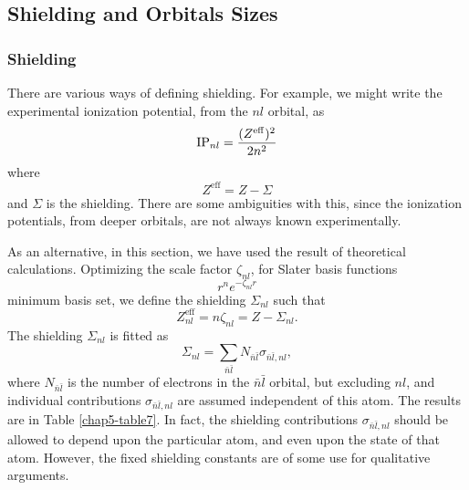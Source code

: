 \subsection{Shielding and Orbitals Sizes}

\subsubsection{Shielding}

There are various ways of defining shielding. For example, we might write the
experimental ionization potential, from the $nl$ orbital, as
\begin{equation}
\mathrm{IP}_{nl} = {(Z^\mathrm{eff})^2 \over 2n^2}
\end{equation}
where
\begin{equation}
Z^\mathrm{eff} = Z - \Sigma
\end{equation}
and $\Sigma$ is the shielding.  There are some ambiguities with this, since 
the ionization potentials, from deeper orbitals, are not always known 
experimentally.

As an alternative, in this section, we have used the result of 
theoretical calculations.  Optimizing the scale factor $\zeta_{nl}$, 
for Slater basis functions
\begin{equation}
r^n e^{- \zeta_{nl}r}
\end{equation}
minimum basis set, we define the shielding $\Sigma_{nl}$ such that
\begin{equation}
Z^\mathrm{eff}_{nl} = n \zeta_{nl} = Z - \Sigma_{nl} .
\end{equation}
The shielding $\Sigma_{nl}$ is fitted as
\begin{equation}
\Sigma_{nl} = \sum_{{\bar n}{\bar l}} N_{{\bar n}{\bar l}} 
\sigma_{{\bar n}{\bar l},nl},
\end{equation}
where $N_{{\bar n}{\bar l}}$ is the number of electrons in the ${{\bar
n}{\bar l}}$ orbital, but excluding $nl$, and individual contributions
$\sigma_{{\bar n}{\bar l},nl}$ are assumed independent of this atom.
The results are in Table \ref{chap5-table7}.  In fact, the shielding
contributions $\sigma_{{\bar n}{\bar l},nl}$ should be allowed to
depend upon the particular atom, and even upon the state of that atom.
However, the fixed shielding constants are of some use for qualitative
arguments.

